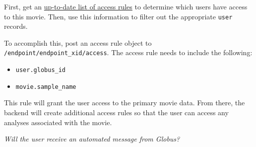 
First, get an \hyperref[section:updatingcollectionaccessrules]{up-to-date list of access rules} 
to determine which users have access to this movie. Then, use this information to filter out the 
appropriate \texttt{user} records.



To accomplish this, post an access rule object to \texttt{/endpoint/endpoint\_xid/access}. The access rule 
needs to include the following:

\begin{itemize}
    \item \texttt{user.globus\_id}
    \item \texttt{movie.sample\_name}
\end{itemize}

This rule will grant the user access to the primary movie data. From there, the backend will 
create additional access rules so that the user can access any analyses associated with the 
movie.

\emph{Will the user receive an automated message from Globus?}

